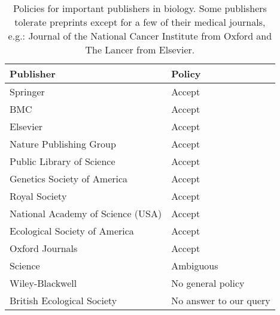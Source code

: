 \documentclass[letterpaper,twocolumn,superscriptaddress,showkeys]{revtex4}
\begin{document}

\begin{table*}
    \centering
    \begin{tabular}{|ll|}
    \hline
    Publisher                                   & Policy \\
    \hline
    Springer                            	& Accept \\
    BMC                                 	& Accept \\
    Elsevier                            	& Accept \\
    Nature Publishing Group             	& Accept \\
    Public Library of Science           	& Accept \\
    Genetics Society of America                 & Accept \\
    Royal Society                       	& Accept \\
    National Academy of Science (USA)           & Accept \\
    Ecological Society of America       	& Accept \\
    Oxford Journals                             & Accept \\
    Science                             	& Ambiguous \\
    Wiley-Blackwell                       	& No general policy \\
    British Ecological Society                  & No answer to our query \\
    \hline
    \end{tabular}
    \caption{Policies for important publishers in biology. Some publishers
tolerate preprints except for a few of their medical journals, e.g.: Journal
of the National Cancer Institute from Oxford and The Lancer from Elsevier.}
    \label{table:policies}
\end{table*}


\end{document}
